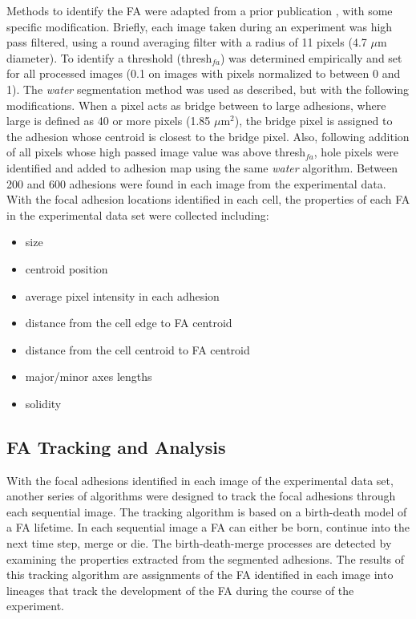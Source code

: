 \documentclass[letterpaper,twocolumn]{article}
\begin{document}
Methods to identify the FA were adapted from a prior publication \cite{Zamir1999}, with some specific modification. Briefly, each image taken during an experiment was high pass filtered, using a round averaging filter with a radius of 11 pixels (4.7 $\mu$m diameter). To identify a threshold (thresh$_{fa}$) was determined empirically and set for all processed images (0.1 on images with pixels normalized to between 0 and 1). The \emph{water} segmentation method was used as described, but with the following modifications. When a pixel acts as bridge between to large adhesions, where large is defined as 40 or more pixels (1.85 $\mu$m$^2$), the bridge pixel is assigned to the adhesion whose centroid is closest to the bridge pixel. Also, following addition of all pixels whose high passed image value was above thresh$_{fa}$, hole pixels were identified and added to adhesion map using the same \emph{water} algorithm. Between 200 and 600 adhesions were found in each image from the experimental data. With the focal adhesion locations identified in each cell, the properties of each FA in the experimental data set were collected including: 

\begin{itemize}
\item size
\item centroid position
\item average pixel intensity in each adhesion 
\item distance from the cell edge to FA centroid
\item distance from the cell centroid to FA centroid
\item major/minor axes lengths
\item solidity 
\end{itemize}

\subsection*{FA Tracking and Analysis}

With the focal adhesions identified in each image of the experimental data set, another series of algorithms were designed to track the focal adhesions through each sequential image. The tracking algorithm is based on a birth-death model of a FA lifetime. In each sequential image a FA can either be born, continue into the next time step, merge or die. The birth-death-merge processes are detected by examining the properties extracted from the segmented adhesions. The results of this tracking algorithm are assignments of the FA identified in each image into lineages that track the development of the FA during the course of the experiment.
\end{document}
